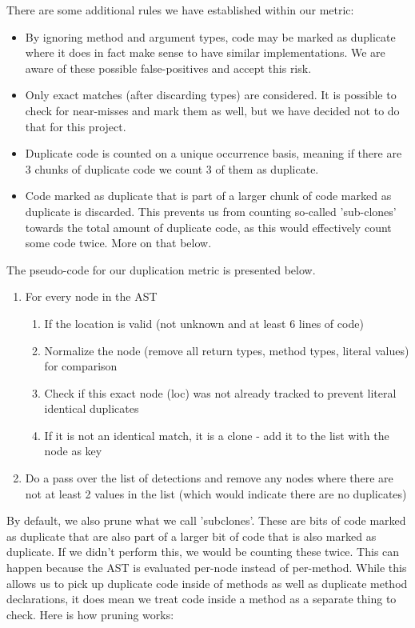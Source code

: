 \documentclass{article}
\begin{document}
There are some additional rules we have established within our metric:
\begin{itemize}
\item By ignoring method and argument types, code may be marked as duplicate where it does in fact make sense to have similar implementations. We are aware of these possible false-positives and accept this risk.
\item Only exact matches (after discarding types) are considered. It is possible to check for near-misses and mark them as well, but we have decided not to do that for this project.
\item Duplicate code is counted on a unique occurrence basis, meaning if there are 3 chunks of duplicate code we count 3 of them as duplicate.
\item Code marked as duplicate that is part of a larger chunk of code marked as duplicate is discarded. This prevents us from counting so-called 'sub-clones' towards the total amount of duplicate code, as this would effectively count some code twice. More on that below.
\end{itemize}

The pseudo-code for our duplication metric is presented below.

\begin{enumerate}
\item For every node in the AST
\begin{enumerate}
\item If the location is valid (not unknown and at least 6 lines of code)
\item Normalize the node (remove all return types, method types, literal values) for comparison
\item Check if this exact node (loc) was not already tracked to prevent literal identical duplicates
\item If it is not an identical match, it is a clone - add it to the list with the node as key
\end{enumerate}
\item Do a pass over the list of detections and remove any nodes where there are not at least 2 values in the list (which would indicate there are no duplicates)
\end{enumerate}

By default, we also prune what we call 'subclones'. These are bits of code marked as duplicate that are also part of a larger bit of code that is also marked as duplicate. If we didn't perform this, we would be counting these twice. This can happen because the AST is evaluated per-node instead of per-method. While this allows us to pick up duplicate code inside of methods as well as duplicate method declarations, it does mean we treat code inside a method as a separate thing to check.
Here is how pruning works:
\end{document}
